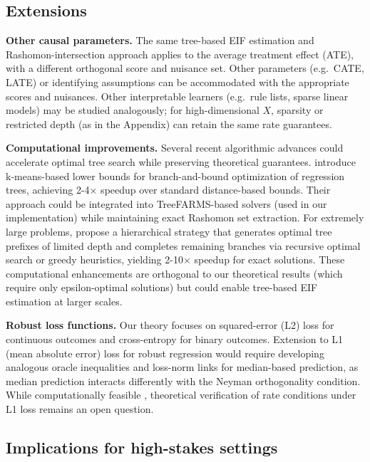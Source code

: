 \documentclass[12pt]{article}
\begin{document}
\subsection{Extensions}

\noindent\textbf{Other causal parameters.}
The same tree-based EIF estimation and Rashomon-intersection approach applies to the average treatment effect (ATE), with a different orthogonal score and nuisance set. Other parameters (e.g.\ CATE, LATE) or identifying assumptions can be accommodated with the appropriate scores and nuisances. Other interpretable learners (e.g.\ rule lists, sparse linear models) may be studied analogously; for high-dimensional $X$, sparsity or restricted depth (as in the Appendix) can retain the same rate guarantees.

\noindent\textbf{Computational improvements.}
Several recent algorithmic advances could accelerate optimal tree search while preserving theoretical guarantees. \citet{zhangOptimalSparseRegression2023} introduce k-means-based lower bounds for branch-and-bound optimization of regression trees, achieving 2-4$\times$ speedup over standard distance-based bounds. Their approach could be integrated into TreeFARMS-based solvers (used in our implementation) while maintaining exact Rashomon set extraction. For extremely large problems, \citet{babbarNearOptimalDecisionTrees2025} propose a hierarchical strategy that generates optimal tree prefixes of limited depth and completes remaining branches via recursive optimal search or greedy heuristics, yielding 2-10$\times$ speedup for exact solutions. These computational enhancements are orthogonal to our theoretical results (which require only epsilon-optimal solutions) but could enable tree-based EIF estimation at larger scales.

\noindent\textbf{Robust loss functions.}
Our theory focuses on squared-error (L2) loss for continuous outcomes and cross-entropy for binary outcomes. Extension to L1 (mean absolute error) loss for robust regression would require developing analogous oracle inequalities and loss-norm links for median-based prediction, as median prediction interacts differently with the Neyman orthogonality condition. While computationally feasible \citep{zhangOptimalSparseRegression2023}, theoretical verification of rate conditions under L1 loss remains an open question.

\subsection{Implications for high-stakes settings}
\end{document}
